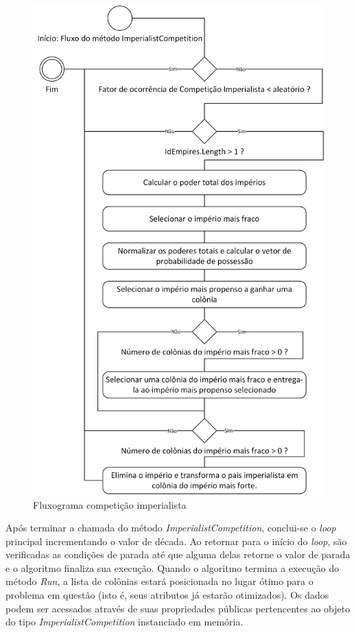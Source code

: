  \begin{figure}[h]
	\centering	
	\includegraphics[scale=0.7]{Figuras/Fluxograms-RunMethodImperialistCompetition.png}
	\caption{Fluxograma competição imperialista}
	\label{fig:Fluxograms-RunMethodImperialistCompetition}
	\end{figure}
    
Após terminar a chamada do método \emph{ImperialistCompetition}, conclui-se o \emph{loop} principal incrementando o valor de década. Ao retornar  para o início do \emph{loop}, são verificadas as condições de parada até que alguma delas retorne o valor de parada e o algoritmo finaliza sua execução. Quando o algoritmo termina a execução do método \emph{Run}, a lista de colônias estará posicionada no lugar ótimo para o problema em questão (isto é, seus atributos já estarão otimizados). Os dados podem ser acessados através de suas propriedades públicas pertencentes ao objeto do tipo \emph{ImperialistCompetition} instanciado em memória.

